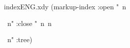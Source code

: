  
 
 
\begin{filecontents*}{indexENG.xdy}
(markup-index :open  "~n
\begin{theindex}
  \providecommand*\lettergroupDefault[1]{}
  \providecommand*\lettergroup[1]{%
    \textit{#1}
    \nopagebreak
  }
  ~n"
  :close "~n~n\end{theindex}~n"
:tree)
\end{filecontents*}

